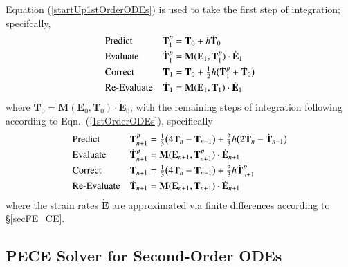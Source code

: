 Equation (\ref{startUp1stOrderODEs}) is used to take the first step of integration; specifcally, 
\begin{subequations}
    \notag
    \begin{align}
    \mbox{} & \text{Predict} & 
    \mathbf{T}_1^p & = \mathbf{T}_0 + h \dot{\mathbf{T}}_0 \\
    \mbox{} & \text{Evaluate} & 
    \dot{\mathbf{T}}^p_1 & = \mathbf{M} ( \mathbf{E}_1 , \mathbf{T}_1^p ) \cdot 
    \dot{\mathbf{E}}_1 \\
    \mbox{} & \text{Correct} &
    \mathbf{T}_1 & = \mathbf{T}_0 + \tfrac{1}{2} h 
    \bigl( \dot{\mathbf{T}}_1^p + \dot{\mathbf{T}}_0 \bigr) \\
    \mbox{} & \text{Re-Evaluate} & 
    \dot{\mathbf{T}}_1 & = \mathbf{M} ( \mathbf{E}_1 , \mathbf{T}_1) \cdot 
    \dot{\mathbf{E}}_1
    \end{align}
\end{subequations}
where $\dot{\mathbf{T}}_0 = \mathbf{M} ( \mathbf{E}_0 , \mathbf{T}_0) \cdot 
\dot{\mathbf{E}}_0$, with the remaining steps of integration following according to Eqn.~(\ref{1stOrderODEs}), specifically
\begin{subequations}
    \notag
    \begin{align}
    \mbox{} & \text{Predict} & 
    \mathbf{T}_{n+1}^p & = \tfrac{1}{3} 
    \bigl( 4 \mathbf{T}_n - \mathbf{T}_{n-1} \bigr) + 
    \tfrac{2}{3} h \bigl( 2 \dot{\mathbf{T}}_n - \dot{\mathbf{T}}_{n-1} 
    \bigr) \\
    \mbox{} & \text{Evaluate} & 
    \dot{\mathbf{T}}^p_{n+1} & = \mathbf{M} ( \mathbf{E}_{n+1} , \mathbf{T}_{n+1}^p ) \cdot \dot{\mathbf{E}}_{n+1} \\
    \mbox{} & \text{Correct} &
    \mathbf{T}_{n+1} & = \tfrac{1}{3} 
    \bigl( 4 \mathbf{T}_n - \mathbf{T}_{n-1} \bigr) + 
    \tfrac{2}{3} h \dot{\mathbf{T}}^{p}_{n+1}  \\
    \mbox{} & \text{Re-Evaluate} & 
    \dot{\mathbf{T}}_{n+1} & = \mathbf{M} ( \mathbf{E}_{n+1} , \mathbf{T}_{n+1} )  
    \cdot \dot{\mathbf{E}}_{n+1}
    \end{align}
\end{subequations} 
where the strain rates $\dot{\mathbf{E}}$ are approximated via finite differences according to \S\ref{secFE_CE}.


\subsection{PECE Solver for Second-Order ODEs}

